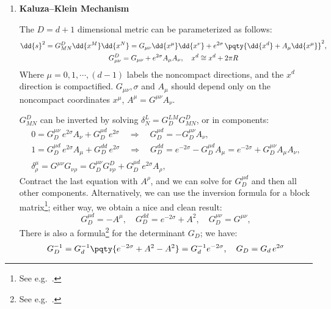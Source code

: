 \documentclass[a4paper,10pt]{article}
\begin{document}
\begin{enumerate}
\begin{enumerate}
	\end{enumerate}
	
	\item \textbf{Kaluza--Klein Mechanism}
	
	The $D = d+1$ dimensional metric can be parameterized as follows:
	\begin{gather}
		\dd{s}^2
		= G_{MN}^D \dd{x^M} \dd{x^N}
		= G_{\mu\nu} \dd{x^\mu} \dd{x^\nu}
			+ e^{2\sigma}\,\pqty{
				\dd{x^d} + A_\mu \dd{x^\mu}
			}^2,
	\\
		G^D_{\mu\nu}
		= G_{\mu\nu} + e^{2\sigma} A_\mu A_\nu,\quad
		x^d \cong x^d + 2\pi R
	\end{gather}
	Where $\mu = 0,1,\cdots,(d-1)$ labels the noncompact directions, and the $x^d$ direction is compactified. $G_{\mu\nu},\sigma$ and $A_\mu$ should depend only on the noncompact coordinates $x^\mu$, $A^\mu = G^{\mu\nu} A_\nu$. 
	
	$G_{MN}^D$ can be inverted by solving $
		\delta^L_N
		= G^{LM}_D G^D_{MN}
	$, or in components:
	\begin{gather}
		0 = G_D^{\mu\nu}\, e^{2\sigma} A_\nu
			+ G_D^{\mu d}\, e^{2\sigma}
	\quad\Longrightarrow\quad
		G_D^{\mu d}
		= - G_D^{\mu\nu} A_\nu,
	\\
		1 = G_D^{\mu d}\, e^{2\sigma} A_\mu
			+ G_D^{dd}\, e^{2\sigma}
	\quad\Longrightarrow\quad
		G_D^{dd}
		= e^{-2\sigma} - G_D^{\mu d} A_\mu
		= e^{-2\sigma} + G_D^{\mu\nu} A_\mu A_\nu,
	\\
		\delta^\mu_\rho
		= G^{\mu\nu} G_{\nu\rho}
		= G_D^{\mu\nu} G^D_{\nu\rho}
			+ G_D^{\mu d}\, e^{2\sigma} A_\rho,
	\end{gather}
	Contract the last equation with $A^\rho$, and we can solve for $G_D^{\mu d}$ and then all other components. 
	Alternatively, we can use the inversion formula for a block matrix\footnote{
		See e.g.~. 
	}; either way, we obtain a nice and clean result:
	\begin{equation}
		G_D^{\mu d}
		= -A^\mu,\quad
		G_D^{dd}
		= e^{-2\sigma} + A^2,\quad
		G_D^{\mu\nu}
		= G^{\mu\nu},
	\end{equation}
	There is also a formula\footnote{
		See e.g.~. 
	} for the determinant $G_D$; we have:
	\begin{equation}
		G_D^{-1}
		= G_d^{-1} \pqty{
				e^{-2\sigma}
				+ A^2 - A^2
			}
		= G_d^{-1} e^{-2\sigma},\quad
		G_D
		= G_d\, e^{2\sigma}
	\end{equation}
	

\end{enumerate}
\end{document}
